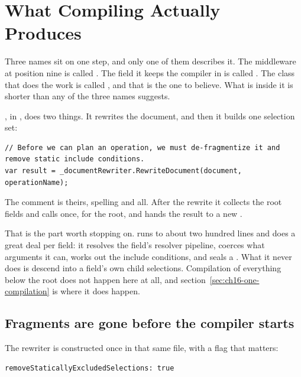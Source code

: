 \section{What Compiling Actually Produces}
\label{sec:ch16-what-compiling-produces}
%

Three names sit on one step, and only one of them describes it. The middleware
at position nine is called
. The field it keeps the compiler in is called
. The class that does the work is called
, and that is the one to believe. What is inside it is
shorter than any of the three names suggests.

%
, in , does two things. It rewrites the
document, and then it builds one selection set:

\begin{verbatim}
// Before we can plan an operation, we must de-fragmentize it and remove static include conditions.
var result = _documentRewriter.RewriteDocument(document, operationName);
\end{verbatim}

The comment is theirs, spelling and all. After the rewrite it collects the root
fields and calls  once, for the root, and hands the
result to a new .

%
That is the part worth stopping on.  runs to about two
hundred lines and does a great deal per field: it resolves the field's resolver
pipeline, coerces what arguments it can, works out the include conditions, and
seals a . What it never does is descend into a field's own child
selections. Compilation of everything below the root does not happen here at
all, and section~\ref{sec:ch16-one-compilation} is where it does happen.

\subsection*{Fragments are gone before the compiler starts}

%
The rewriter is constructed once in that same file, with a flag that matters:

\begin{verbatim}
removeStaticallyExcludedSelections: true
\end{verbatim}

